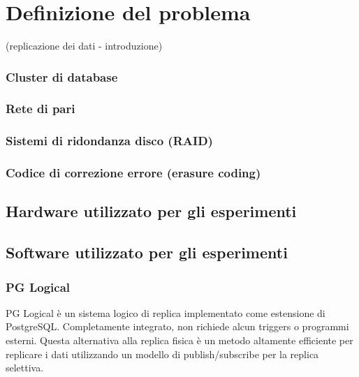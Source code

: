 \chapter{Definizione del problema}
\setcounter{section}{1}

(replicazione dei dati - introduzione)
\subsection{Cluster di database}
\subsection{Rete di pari}
\subsection{Sistemi di ridondanza disco (RAID)}
\subsection{Codice di correzione errore (erasure coding)}
\section{Hardware utilizzato per gli esperimenti}
\section{Software utilizzato per gli esperimenti}

\subsection{PG Logical}
PG Logical \`e un sistema logico di replica implementato come estensione di PostgreSQL. Completamente integrato, non richiede alcun triggers o programmi esterni. Questa alternativa alla replica fisica \`e un metodo altamente efficiente per replicare i dati utilizzando un modello di publish/subscribe per la replica selettiva.

